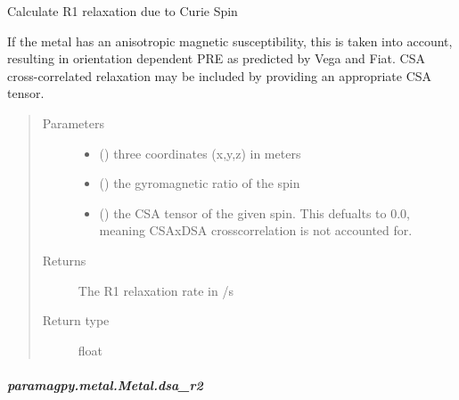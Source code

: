 \documentclass[a4paper,10pt,english]{sphinxmanual}
\begin{document}
\begin{fulllineitems}
\begin{fulllineitems}
\begin{fulllineitems}
\label{\detokenize{reference/generated/paramagpy.metal.Metal.dsa_r1:paramagpy.metal.Metal.dsa_r1}}
Calculate R1 relaxation due to Curie Spin

If the metal has an anisotropic magnetic susceptibility, this is
taken into account, resulting in orientation dependent PRE as
predicted by Vega and Fiat. CSA cross-correlated relaxation may
be included by providing an appropriate CSA tensor.
\begin{quote}\begin{description}
\item[{Parameters}] \leavevmode\begin{itemize}
\item {} 
 () \textendash{} three coordinates (x,y,z) in meters

\item {} 
 () \textendash{} the gyromagnetic ratio of the spin

\item {} 
 (\sphinxstyleliteralemphasis{\sphinxupquote{ (}}\sphinxstyleliteralemphasis{\sphinxupquote{)}}) \textendash{} the CSA tensor of the given spin.
This defualts to 0.0, meaning CSAxDSA crosscorrelation is
not accounted for.

\end{itemize}

\item[{Returns}] \leavevmode
{} \textendash{} The R1 relaxation rate in /s

\item[{Return type}] \leavevmode
float

\end{description}\end{quote}

\end{fulllineitems}



\subparagraph{paramagpy.metal.Metal.dsa\_r2}
\label{\detokenize{reference/generated/paramagpy.metal.Metal.dsa_r2:paramagpy-metal-metal-dsa-r2}}\label{\detokenize{reference/generated/paramagpy.metal.Metal.dsa_r2::doc}}


\end{fulllineitems}
\end{fulllineitems}
\end{document}
